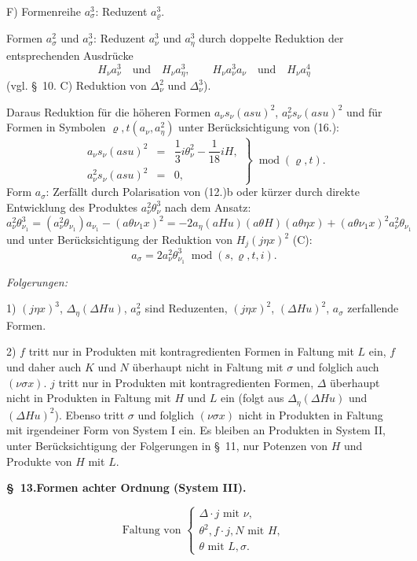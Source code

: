 \documentclass[11pt]{article}
\newcommand{\A}{\Delta}
\newcommand{\R}{\varrho}
\newcommand{\modu}[1]{\;\operatorname{mod} #1}
\providecommand{\modu}[1]{\;\operatorname{mod} #1}
\begin{document}
\noindent F) Formenreihe $a_\sigma^3$: Reduzent $a_\R^3$.

Formen $a_\sigma^2$ und $a_\sigma^3$: Reduzent $a_\nu^3$ und $a_\eta^3$ durch doppelte Reduktion der entsprechenden Ausdrücke
\[
H_\nu a_\nu^3\quad\text{und}\quad H_\nu a_\eta^3,
\qquad
H_\nu a_\nu^3a_\nu\quad\text{und}\quad H_\nu a_\eta^4
\]
(vgl. \S\ 10. C) Reduktion von $\A_\nu^2$ und $\A_\nu^3$).

Daraus Reduktion für die höheren Formen $a_\nu s_\nu(asu)^2$, $a_\nu^2s_\nu(asu)^2$ und für Formen in Symbolen $\R,t(a_\nu,a_\eta^2)$ unter Berücksichtigung von (16.):
\[
\tag{19}
\left.\begin{array}{rcl}
a_\nu s_\nu(asu)^2&=&\dfrac13 i\theta_\nu^2-\dfrac1{18}iH,\\[0.5em]
a_\nu^2s_\nu(asu)^2&=&0,
\end{array}\right\}\modu{(\R,t)}.
\]
Form $a_\sigma$: Zerfällt durch Polarisation von (12.)b oder kürzer durch direkte Entwicklung des Produktes $a_\nu^2\theta_\nu^3$ nach dem Ansatz:
\[
a_\nu^2\theta_{\nu_1}^3=(a_\nu^2\theta_{\nu_1})a_{\nu_1}-(a\theta\nu_1x)^2
=-2a_\eta(aHu)(a\theta H)(a\theta\eta x)+(a\theta\nu_1x)^2a_\nu^2\theta_{\nu_1}
\]
und unter Berücksichtigung der Reduktion von $H_j(j\eta x)^2$ (C):
\[
\tag{20}a_\sigma=2a_\nu^2\theta_{\nu_1}^3\modu{(s,\R,t,i)}.
\]

\noindent\emph{Folgerungen:}

1) $(j\eta x)^3$, $\A_\eta(\A Hu)$, $a_\sigma^2$ sind Reduzenten, $(j\eta x)^2$, $(\A Hu)^2$, $a_\sigma$ zerfallende Formen.

2) $f$ tritt nur in Produkten mit kontragredienten Formen in Faltung mit $L$ ein, $f$ und daher auch $K$ und $N$ überhaupt nicht in Faltung mit $\sigma$ und folglich auch $(\nu\sigma x)$. $j$ tritt nur in Produkten mit kontragredienten Formen, $\A$ überhaupt nicht in Produkten in Faltung mit $H$ und $L$ ein (folgt aus $\A_\eta(\A Hu)$ und $(\A Hu)^2$). Ebenso tritt $\sigma$ und folglich $(\nu\sigma x)$ nicht in Produkten in Faltung mit irgendeiner Form von System I ein. Es bleiben an Produkten in System II, unter Berücksichtigung der Folgerungen in \S\ 11, nur Potenzen von $H$ und Produkte von $H$ mit $L$.

\begin{center}
\textbf{\S\ 13.\quad Formen achter Ordnung (System III).}
\end{center}
\[
\text{Faltung von }\left\{\begin{array}{l}
\A\cdot j\text{ mit }\nu,\\
\theta^2,
 f\cdot j,
 N\text{ mit }H,\\
\theta\text{ mit }L,\sigma.
\end{array}\right.
\]
\end{document}
